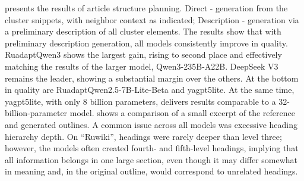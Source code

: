 \documentclass{superfri}
\begin{document}

 presents the results of article structure planning.
Direct - generation from the cluster snippets, with neighbor context as indicated; Description - generation via a preliminary description of all cluster elements.
The results show that with preliminary description generation, all models consistently improve in quality.
RuadaptQwen3 shows the largest gain, rising to second place and effectively matching the results of the larger model,
Qwen3-\allowbreak 235B-\allowbreak A22B. DeepSeek V3 remains the leader, showing a substantial margin over the others. At the bottom in quality are RuadaptQwen2.5-7B-\allowbreak Lite-\allowbreak Beta and yagpt5lite.
At the same time, yagpt5lite, with only 8 billion parameters, delivers results comparable to a 32-billion-parameter model.
 shows a comparison of a small excerpt of the reference and generated outlines.
A common issue across all models was excessive heading hierarchy depth.
On “Ruwiki”, headings were rarely deeper than level three; however, the models often created fourth- and fifth-level headings, implying that all information belongs in one large section,
even though it may differ somewhat in meaning and, in the original outline, would correspond to unrelated headings.
\end{document}
